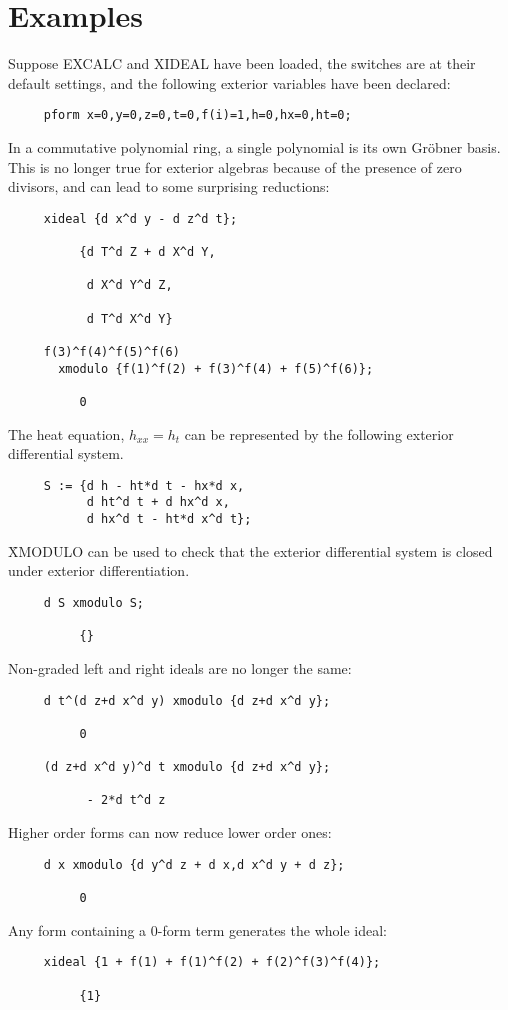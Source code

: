 \section{Examples}

Suppose EXCALC and XIDEAL have been loaded, the switches are at their
default settings, and the following exterior variables have been declared:

\begin{verbatim}
     pform x=0,y=0,z=0,t=0,f(i)=1,h=0,hx=0,ht=0;
\end{verbatim}

In a commutative polynomial ring, a single polynomial is its own Gr\"obner
basis. This is no longer true for exterior algebras because of the presence
of zero divisors, and can lead to some surprising reductions:
\begin{verbatim}
     xideal {d x^d y - d z^d t};

          {d T^d Z + d X^d Y,

           d X^d Y^d Z,

           d T^d X^d Y}

     f(3)^f(4)^f(5)^f(6)
       xmodulo {f(1)^f(2) + f(3)^f(4) + f(5)^f(6)};

          0
\end{verbatim}

The heat equation, $h_{xx}=h_t$ can be represented by the following
exterior differential system.
\begin{verbatim}
     S := {d h - ht*d t - hx*d x,
           d ht^d t + d hx^d x,
           d hx^d t - ht*d x^d t};
\end{verbatim}
\f{XMODULO} can be used to check that the exterior differential system is
closed under exterior differentiation.
\begin{verbatim}
     d S xmodulo S;

          {}
\end{verbatim}

Non-graded left and right ideals are no longer the same:
\begin{verbatim}
     d t^(d z+d x^d y) xmodulo {d z+d x^d y};

          0

     (d z+d x^d y)^d t xmodulo {d z+d x^d y};

           - 2*d t^d z
\end{verbatim}
Higher order forms can now reduce lower order ones:
\begin{verbatim}
     d x xmodulo {d y^d z + d x,d x^d y + d z};

          0
\end{verbatim}
Any form containing a 0-form term generates the whole ideal:
\begin{verbatim}
     xideal {1 + f(1) + f(1)^f(2) + f(2)^f(3)^f(4)};

          {1}
\end{verbatim}


